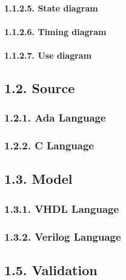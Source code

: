 \documentclass[
]{article}
\begin{document}
\hypertarget{state-diagram-1}{%
\paragraph{1.1.2.5. State diagram}\label{state-diagram-1}}

\hypertarget{timing-diagram-1}{%
\paragraph{1.1.2.6. Timing diagram}\label{timing-diagram-1}}

\hypertarget{use-diagram-1}{%
\paragraph{1.1.2.7. Use diagram}\label{use-diagram-1}}

\hypertarget{source-1}{%
\subsection{1.2. Source}\label{source-1}}

\hypertarget{ada-language-1}{%
\subsubsection{1.2.1. Ada Language}\label{ada-language-1}}

\hypertarget{c-language-1}{%
\subsubsection{1.2.2. C Language}\label{c-language-1}}

\hypertarget{model-1}{%
\subsection{1.3. Model}\label{model-1}}

\hypertarget{vhdl-language-3}{%
\subsubsection{1.3.1. VHDL Language}\label{vhdl-language-3}}

\hypertarget{verilog-language-3}{%
\subsubsection{1.3.2. Verilog Language}\label{verilog-language-3}}

\hypertarget{validation-1}{%
\subsection{1.5. Validation}\label{validation-1}}
\end{document}
